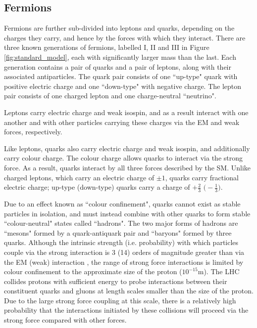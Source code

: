 \subsection{Fermions}
\label{sec:fermions}

Fermions are further sub-divided into leptons and quarks, depending on the charges they carry, and hence by the forces with which they interact. There are three known generations of fermions, labelled I, II and III in Figure \ref{fig:standard_model}, each with significantly larger mass than the last. Each generation contains a pair of quarks and a pair of leptons, along with their associated antiparticles. The quark pair consists of one ``up-type" quark with positive electric charge and one ``down-type" with negative charge. The lepton pair consists of one charged lepton and one charge-neutral ``neutrino". 

Leptons carry electric charge and weak isospin, and as a result interact with one another and with other particles carrying these charges via the EM and weak forces, respectively.  

Like leptons, quarks also carry electric charge and weak isospin, and additionally carry colour charge. The colour charge allows quarks to interact via the strong force. As a result, quarks interact by all three forces described by the SM. Unlike charged leptons, which carry an electric charge of \(\pm1\), quarks carry fractional electric charge; up-type (down-type) quarks carry a charge of \(+\frac{2}{3}\) \(\big(-\frac{1}{3}\big)\).

Due to an effect known as ``colour confinement", quarks cannot exist as stable particles in isolation, and must instead combine with other quarks to form stable ``colour-neutral" states called ``hadrons". The two major forms of hadrons are ``mesons" formed by a quark-antiquark pair and ``baryons" formed by three quarks. Although the intrinsic strength (i.e. probability) with which particles couple via the strong interaction is 3 (14) orders of magnitude greater than via the EM (weak) interaction \cite{griffiths_2008}, the range of strong force interactions is limited by colour confinement to the approximate size of the proton (\(10^{-15}\)m). The LHC collides protons with sufficient energy to probe interactions between their constituent quarks and gluons at length scales smaller than the size of the proton. Due to the large strong force coupling at this scale, there is a relatively high probability that the interactions initiated by these collisions will proceed via the strong force compared with other forces. 

